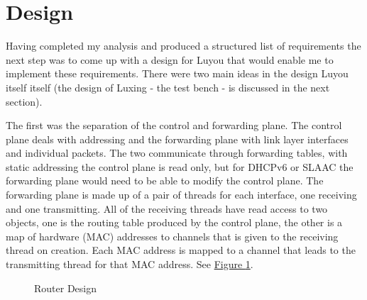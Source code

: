 \documentclass[12pt,a4paper,twoside,openright]{report}
\begin{document}
\section{Design}
\label{sec::design}

Having completed my analysis and produced a structured list of requirements the next step was to come up with a design for Luyou that would enable me to implement these requirements.  There were two main ideas in the design Luyou itself itself (the design of Luxing - the test bench - is discussed in the next section). 

\bigskip

The first was the separation of the control and forwarding plane. The control plane deals with addressing and the forwarding plane with link layer interfaces and individual packets.  The two communicate through forwarding tables, with static addressing the control plane is read only, but for DHCPv6 or SLAAC the forwarding plane would need to be able to modify the control plane. The forwarding plane is made up of a pair of threads for each interface, one receiving and one transmitting. All of the receiving threads have read access to two objects, one is the routing table produced by the control plane, the other is a map of hardware (MAC) addresses to channels that is given to the receiving thread on creation.  Each MAC address is mapped to a channel that leads to the transmitting thread for that MAC address. See \hyperref[fig::router_design]{Figure }\ref{fig::router_design}.

\begin{figure}
\centering
{}
\caption{Router Design}
\label{fig::router_design}
\end{figure}
\end{document}
